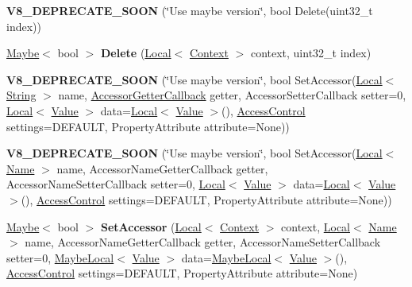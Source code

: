 \begin{DoxyCompactItemize}
\item 
\hypertarget{classv8_1_1Object_a97a29f705ad4a7dda2f04d80dd80ef98}{}{\bfseries V8\+\_\+\+D\+E\+P\+R\+E\+C\+A\+T\+E\+\_\+\+S\+O\+O\+N} (\char`\"{}Use maybe version\char`\"{}, bool Delete(uint32\+\_\+t index))\label{classv8_1_1Object_a97a29f705ad4a7dda2f04d80dd80ef98}

\item 
\hypertarget{classv8_1_1Object_aabd005ef33ff69c15562d5296f4982d0}{}\hyperlink{classv8_1_1Maybe}{Maybe}$<$ bool $>$ {\bfseries Delete} (\hyperlink{classv8_1_1Local}{Local}$<$ \hyperlink{classv8_1_1Context}{Context} $>$ context, uint32\+\_\+t index)\label{classv8_1_1Object_aabd005ef33ff69c15562d5296f4982d0}

\item 
\hypertarget{classv8_1_1Object_a80ab45ba0cc3e0ff8d6c863bdbbc5195}{}{\bfseries V8\+\_\+\+D\+E\+P\+R\+E\+C\+A\+T\+E\+\_\+\+S\+O\+O\+N} (\char`\"{}Use maybe version\char`\"{}, bool Set\+Accessor(\hyperlink{classv8_1_1Local}{Local}$<$ \hyperlink{classv8_1_1String}{String} $>$ name, \hyperlink{namespacev8_a722613c87061708a4f1aa050d095f868}{Accessor\+Getter\+Callback} getter, Accessor\+Setter\+Callback setter=0, \hyperlink{classv8_1_1Local}{Local}$<$ \hyperlink{classv8_1_1Value}{Value} $>$ data=\hyperlink{classv8_1_1Local}{Local}$<$ \hyperlink{classv8_1_1Value}{Value} $>$(), \hyperlink{namespacev8_a31d8355cb043d7d2dda3f4a52760b64e}{Access\+Control} settings=D\+E\+F\+A\+U\+L\+T, Property\+Attribute attribute=None))\label{classv8_1_1Object_a80ab45ba0cc3e0ff8d6c863bdbbc5195}

\item 
\hypertarget{classv8_1_1Object_a19f25d6ccca31eff3f81f2b237042cbf}{}{\bfseries V8\+\_\+\+D\+E\+P\+R\+E\+C\+A\+T\+E\+\_\+\+S\+O\+O\+N} (\char`\"{}Use maybe version\char`\"{}, bool Set\+Accessor(\hyperlink{classv8_1_1Local}{Local}$<$ \hyperlink{classv8_1_1Name}{Name} $>$ name, Accessor\+Name\+Getter\+Callback getter, Accessor\+Name\+Setter\+Callback setter=0, \hyperlink{classv8_1_1Local}{Local}$<$ \hyperlink{classv8_1_1Value}{Value} $>$ data=\hyperlink{classv8_1_1Local}{Local}$<$ \hyperlink{classv8_1_1Value}{Value} $>$(), \hyperlink{namespacev8_a31d8355cb043d7d2dda3f4a52760b64e}{Access\+Control} settings=D\+E\+F\+A\+U\+L\+T, Property\+Attribute attribute=None))\label{classv8_1_1Object_a19f25d6ccca31eff3f81f2b237042cbf}

\item 
\hypertarget{classv8_1_1Object_a6ab0b45aa38debc2cc9877ae3b232e55}{}\hyperlink{classv8_1_1Maybe}{Maybe}$<$ bool $>$ {\bfseries Set\+Accessor} (\hyperlink{classv8_1_1Local}{Local}$<$ \hyperlink{classv8_1_1Context}{Context} $>$ context, \hyperlink{classv8_1_1Local}{Local}$<$ \hyperlink{classv8_1_1Name}{Name} $>$ name, Accessor\+Name\+Getter\+Callback getter, Accessor\+Name\+Setter\+Callback setter=0, \hyperlink{classv8_1_1MaybeLocal}{Maybe\+Local}$<$ \hyperlink{classv8_1_1Value}{Value} $>$ data=\hyperlink{classv8_1_1MaybeLocal}{Maybe\+Local}$<$ \hyperlink{classv8_1_1Value}{Value} $>$(), \hyperlink{namespacev8_a31d8355cb043d7d2dda3f4a52760b64e}{Access\+Control} settings=D\+E\+F\+A\+U\+L\+T, Property\+Attribute attribute=None)\label{classv8_1_1Object_a6ab0b45aa38debc2cc9877ae3b232e55}


\end{DoxyCompactItemize}
